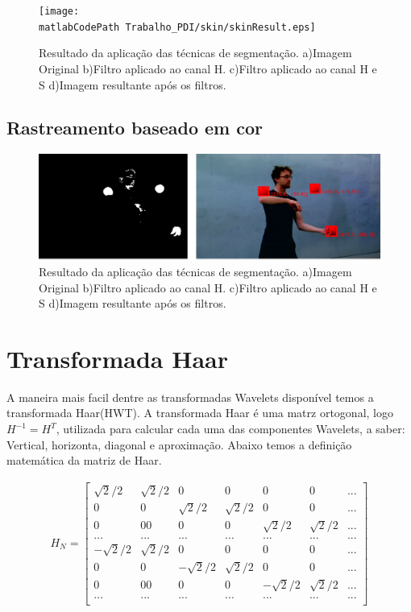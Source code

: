 \documentclass[
	article,			%
	11pt,				%
	oneside,			%
	a4paper,			%
	english,			%
	brazil,				%
	sumario=tradicional
	]{abntex2}
\newcommand{\matlabCodePath}{/home/clifte/git/Mestrado/Matlab/}
\begin{document}
\begin{figure} 
		\centering 
		\texttt{[image: \\matlabCodePath
		Trabalho\_PDI/skin/skinResult.eps]}
		\caption{Resultado da aplicação das técnicas de segmentação.
		a)Imagem Original
		b)Filtro aplicado ao canal H.
		c)Filtro aplicado ao canal H e S
		d)Imagem resultante após os filtros.
		}
		\label{fig:skinSegment}		
\end{figure}

\subsection{Rastreamento baseado em cor}
\begin{figure} 
		\centering 
		\includegraphics[width=\textwidth,scale=1, trim =
		4cm 0cm 0cm 1cm,clip]{imagens/track/redBall.png}
		\caption{Resultado da aplicação das técnicas de segmentação.
		a)Imagem Original
		b)Filtro aplicado ao canal H.
		c)Filtro aplicado ao canal H e S
		d)Imagem resultante após os filtros.
		}
		\label{fig:skinSegment}		
\end{figure}



\section{Transformada Haar}

A maneira mais facil dentre as transformadas Wavelets disponível temos a
transformada Haar(HWT).
A transformada Haar é uma matrz ortogonal, logo $H^{-1}=H^{T}$, utilizada para
calcular cada uma das componentes Wavelets, a saber: Vertical, horizonta,
diagonal e aproximação. Abaixo temos a definição matemática da matriz de Haar.

\begin{align}
H_{N} = 
\begin{bmatrix} 
	\sqrt{2}/2 & \sqrt{2}/2 & 0 & 0 & 0 & 0 &...\\
	 0 & 0 & \sqrt{2}/2 & \sqrt{2}/2 & 0 & 0 &...\\
	 0 & 0 0 & 0 & 0 & \sqrt{2}/2 & \sqrt{2}/2 &... \\
         ...&...&...&...&...&...&...\\
	-\sqrt{2}/2 & \sqrt{2}/2 & 0 & 0 & 0 & 0 &...\\
	 0 & 0 & -\sqrt{2}/2 & \sqrt{2}/2 & 0 & 0 &...\\
	 0 & 0 0 & 0 & 0 & -\sqrt{2}/2 & \sqrt{2}/2 &... \\
         ...&...&...&...&...&...&...\\
\end{bmatrix}
\label{eq:haarMask}
\end{align}
\end{document}
